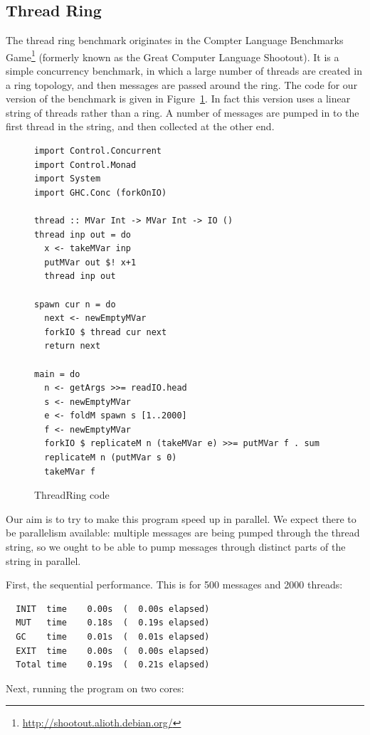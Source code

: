 \subsection{Thread Ring}

The thread ring benchmark originates in the Compter Language
Benchmarks Game\footnote{\url{http://shootout.alioth.debian.org/}}
(formerly known as the Great Computer Language Shootout).  It is a
simple concurrency benchmark, in which a large number of threads are
created in a ring topology, and then messages are passed around the
ring.  The code for our version of the benchmark is given in
Figure~\ref{f:threadring-code}.  In fact this version uses a linear
string of threads rather than a ring.  A number of messages are pumped
in to the first thread in the string, and then collected at the other
end.

\begin{figure}
\begin{lstlisting}
import Control.Concurrent
import Control.Monad
import System
import GHC.Conc (forkOnIO)

thread :: MVar Int -> MVar Int -> IO ()
thread inp out = do 
  x <- takeMVar inp
  putMVar out $! x+1
  thread inp out

spawn cur n = do 
  next <- newEmptyMVar
  forkIO $ thread cur next
  return next

main = do 
  n <- getArgs >>= readIO.head
  s <- newEmptyMVar
  e <- foldM spawn s [1..2000]
  f <- newEmptyMVar
  forkIO $ replicateM n (takeMVar e) >>= putMVar f . sum
  replicateM n (putMVar s 0)
  takeMVar f
\end{lstlisting}
\caption{ThreadRing code}
\label{f:threadring-code}
\end{figure}

Our aim is to try to make this program speed up in parallel.  We
expect there to be parallelism available: multiple messages are
being pumped through the thread string, so we ought to be able to pump
messages through distinct parts of the string in parallel.

First, the sequential performance.  This is for 500 messages and 2000 threads:

\begin{verbatim}
  INIT  time    0.00s  (  0.00s elapsed)
  MUT   time    0.18s  (  0.19s elapsed)
  GC    time    0.01s  (  0.01s elapsed)
  EXIT  time    0.00s  (  0.00s elapsed)
  Total time    0.19s  (  0.21s elapsed)
\end{verbatim}

Next, running the program on two cores:

